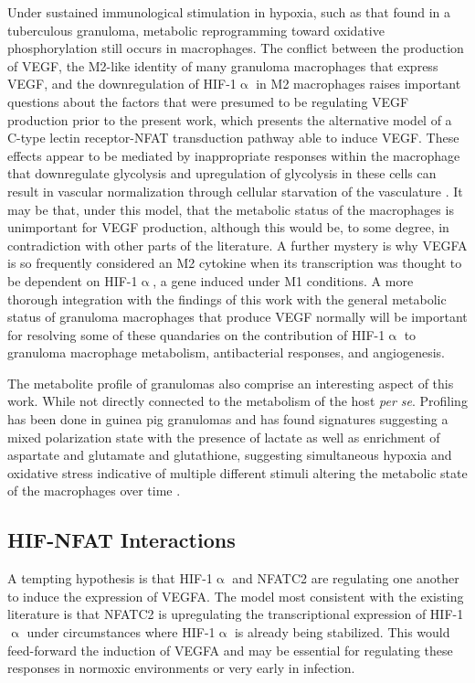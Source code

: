 Under sustained immunological stimulation in hypoxia, such as that found in a tuberculous granuloma, metabolic reprogramming toward oxidative phosphorylation still occurs in macrophages. The conflict between the production of VEGF, the M2-like identity of many granuloma macrophages that express VEGF, and the downregulation of HIF-1$\upalpha$ in M2 macrophages raises important questions about the factors that were presumed to be regulating VEGF production prior to the present work, which presents the alternative model of a C-type lectin receptor-NFAT transduction pathway able to induce VEGF. These effects appear to be mediated by inappropriate responses within the macrophage that downregulate glycolysis and upregulation of glycolysis in these cells can result in vascular normalization through cellular starvation of the vasculature \citep{Wenes2016}. It may be that, under this model, that the metabolic status of the macrophages is unimportant for VEGF production, although this would be, to some degree, in contradiction with other parts of the literature. A further mystery is why VEGFA is so frequently considered an M2 cytokine when its transcription was thought to be dependent on HIF-1$\upalpha$, a gene induced under M1 conditions. A more thorough integration with the findings of this work with the general metabolic status of granuloma macrophages that produce VEGF normally will be important for resolving some of these quandaries on the contribution of HIF-1$\upalpha$ to granuloma macrophage metabolism, antibacterial responses, and angiogenesis.

The metabolite profile of granulomas also comprise an interesting aspect of this work. While not directly connected to the metabolism of the host \textit{per se}. Profiling has been done in guinea pig granulomas and has found signatures suggesting a mixed polarization state with the presence of lactate as well as enrichment of aspartate and glutamate and glutathione, suggesting simultaneous hypoxia and oxidative stress indicative of multiple different stimuli altering the metabolic state of the macrophages over time \citep{Somashekar2011}.

\subsection{HIF-NFAT Interactions}

A tempting hypothesis is that HIF-1$\upalpha$ and NFATC2 are regulating one another to induce the expression of VEGFA. The model most consistent with the existing literature is that NFATC2 is upregulating the transcriptional expression of HIF-1$\upalpha$ under circumstances where HIF-1$\upalpha$ is already being stabilized. This would feed-forward the induction of VEGFA and may be essential for regulating these responses in normoxic environments or very early in infection. 

